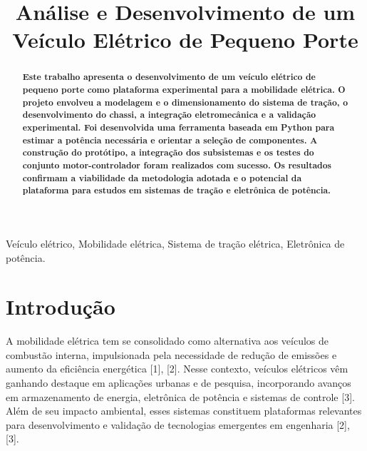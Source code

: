 \documentclass[conference]{IEEEtran}
\begin{document}
\title{Análise e Desenvolvimento de um Veículo Elétrico de Pequeno Porte}

\author{
}

\maketitle



\begin{abstract}
\bfseries
Este trabalho apresenta o desenvolvimento de um veículo elétrico de pequeno porte como plataforma experimental para a mobilidade elétrica. O projeto envolveu a modelagem e o dimensionamento do sistema de tração, o desenvolvimento do chassi, a integração eletromecânica e a validação experimental. Foi desenvolvida uma ferramenta baseada em Python para estimar a potência necessária e orientar a seleção de componentes. A construção do protótipo, a integração dos subsistemas e os testes do conjunto motor-controlador foram realizados com sucesso. Os resultados confirmam a viabilidade da metodologia adotada e o potencial da plataforma para estudos em sistemas de tração e eletrônica de potência.
\end{abstract}

\renewcommand{\IEEEkeywordsname}{Palavras-chave}
\begin{IEEEkeywords}
Veículo elétrico, Mobilidade elétrica, Sistema de tração elétrica, Eletrônica de potência.
\end{IEEEkeywords}




\section{Introdução}

A mobilidade elétrica tem se consolidado como alternativa aos veículos de combustão interna, impulsionada pela necessidade de redução de emissões e aumento da eficiência energética [1], [2]. Nesse contexto, veículos elétricos vêm ganhando destaque em aplicações urbanas e de pesquisa, incorporando avanços em armazenamento de energia, eletrônica de potência e sistemas de controle [3]. Além de seu impacto ambiental, esses sistemas constituem plataformas relevantes para desenvolvimento e validação de tecnologias emergentes em engenharia [2], [3].
\end{document}
